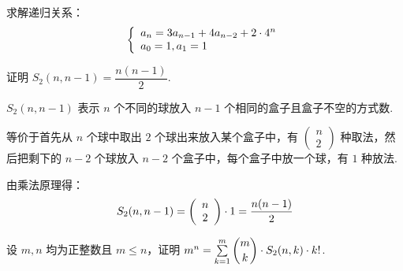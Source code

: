 \documentclass[cn, hazy, blue, normal, 12pt]{elegantnote}
\begin{document}
\begin{exercise}

    求解递归关系：
    \begin{equation}
        \notag
        \left\{\begin{array}{l}
            a_{n}=3 a_{n-1}+4 a_{n-2}+2 \cdot 4^{n} \\
            a_{0}=1, a_{1}=1
        \end{array}\right.
    \end{equation}

\end{exercise}

\begin{exercise}

    证明 $S_{2}(n, n-1) = \dfrac{n(n-1)}{2}$.

\end{exercise}

\begin{solution}[print=true]

    $S_2(n,n-1)$ 表示 $n$ 个不同的球放入 $n-1$ 个相同的盒子且盒子不空的方式数.

    等价于首先从 $n$ 个球中取出 $2$ 个球出来放入某个盒子中，有
    $\left(\begin{array}{c}n\\2\end{array}\right)$
    种取法，然后把剩下的 $n-2$ 个球放入 $n-2$ 个盒子中，每个盒子中放一个球，有 $1$ 种放法.

    由乘法原理得：
    \begin{equation}
        \notag
        S_{2}(n, n-1) = \left(
        \begin{array}{c}n\\2\end{array}
        \right) \cdot 1 =
        \dfrac{n(n-1)}{2}
    \end{equation}

\end{solution}

\begin{exercise}

    设 $m, n$ 均为正整数且 $m\leq n$，证明 $m^n = \sum\limits_{k=1}^{m} {\dbinom{m}{k} \cdot S_2(n,k) \cdot k!}$.

\end{exercise}
\end{document}
